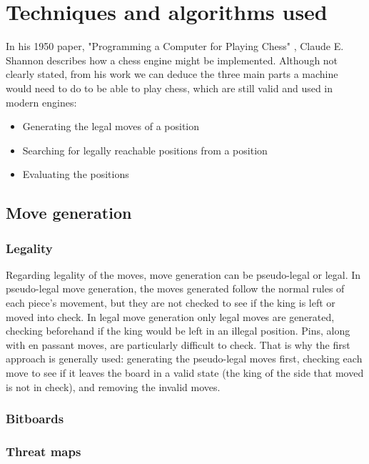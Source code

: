 \chapter{Techniques and algorithms used}
\label{chap:ch2}

In his 1950 paper, "Programming a Computer for Playing Chess" \cite{shannon1950xxii}, Claude E. Shannon describes how a chess engine might be implemented. Although not clearly stated, from his work we can deduce the three main parts a machine would need to do to be able to play chess, which are still valid and used in modern engines:
\begin{itemize}
    \item Generating the legal moves of a position
    \item Searching for legally reachable positions from a position
    \item Evaluating the positions
\end{itemize}

\section{Move generation}
\label{sec:ch2sec1}

\subsection{Legality}
\label{subsec:ch2sec1subsec1}

Regarding legality of the moves, move generation can be pseudo-legal or legal. In pseudo-legal move generation, the moves generated follow the normal rules of each piece's movement, but they are not checked to see if the king is left or moved into check. In legal move generation only legal moves are generated, checking beforehand if the king would be left in an illegal position. Pins, along with en passant moves, are particularly difficult to check. That is why the first approach is generally used: generating the pseudo-legal moves first, checking each move to see if it leaves the board in a valid state (the king of the side that moved is not in check), and removing the invalid moves.

\subsection{Bitboards}
\label{subsec:ch2sec1subsec2}

\subsection{Threat maps}
\label{subsec:ch2sec1subsec3}

